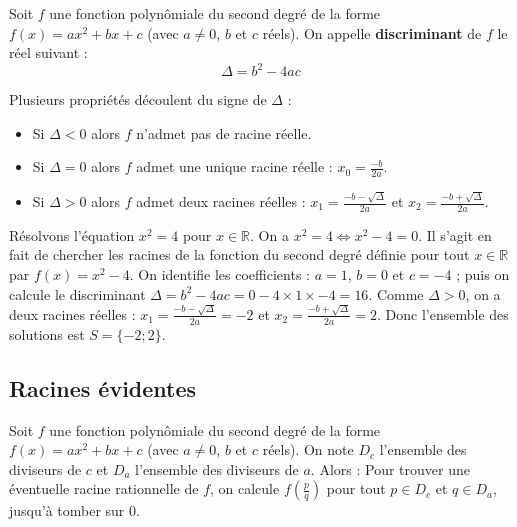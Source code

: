 	\begin{formula}[Définition]
		Soit $f$ une fonction polynômiale du second degré de la forme $f(x) = ax^2 + bx + c$ (avec $a \neq 0$, $b$ et $c$ réels). On appelle \textbf{discriminant} de $f$ le réel suivant :
		\[ \Delta = b^2 - 4ac \]
	\end{formula}
	
	\begin{formula}[Propriétés]
		Plusieurs propriétés découlent du signe de $\Delta$ :
		\begin{itemize}
			\item Si $\Delta < 0$ alors $f$ n'admet pas de racine réelle.
			\item Si $\Delta = 0$ alors $f$ admet une unique racine réelle : $x_0 = \frac{-b}{2a}$.
			\item Si $\Delta > 0$ alors $f$ admet deux racines réelles : $x_1 = \frac{-b - \sqrt{\Delta}}{2a}$ et $x_2 = \frac{-b + \sqrt{\Delta}}{2a}$.
		\end{itemize}
	\end{formula}
	
	\begin{tip}[Exemple]
		Résolvons l'équation $x^2 = 4$ pour $x \in \mathbb{R}$.
		\newpar
		On a $x^2 = 4 \iff x^2 - 4 = 0$. Il s'agit en fait de chercher les racines de la fonction du second degré définie pour tout $x \in \mathbb{R}$ par $f(x) = x^2 - 4$.
		\newline
		On identifie les coefficients : $a = 1$, $b = 0$ et $c = -4$ ; puis on calcule le discriminant $\Delta = b^2 - 4ac = 0 - 4 \times 1 \times -4 = 16$.
		\newpar
		Comme $\Delta > 0$, on a deux racines réelles :
		$x_1 = \frac{-b - \sqrt{\Delta}}{2a} = -2$ et $x_2 = \frac{-b + \sqrt{\Delta}}{2a} = 2$.
		\newpar
		Donc l'ensemble des solutions est $S = \{-2; 2\}$.
	\end{tip}
	
	\subsection{Racines évidentes}
	
	\begin{formula}
		Soit $f$ une fonction polynômiale du second degré de la forme $f(x) = ax^2 + bx +c$ (avec $a \neq 0$, $b$ et $c$ réels). On note $D_c$ l'ensemble des diviseurs de $c$ et $D_a$ l'ensemble des diviseurs de $a$. Alors :
		\newpar
		Pour trouver une éventuelle racine rationnelle de $f$, on calcule $f\left(\frac{p}{q}\right)$ pour tout $p \in D_c$ et $q \in D_a$, jusqu'à tomber sur $0$.
	\end{formula}
	
